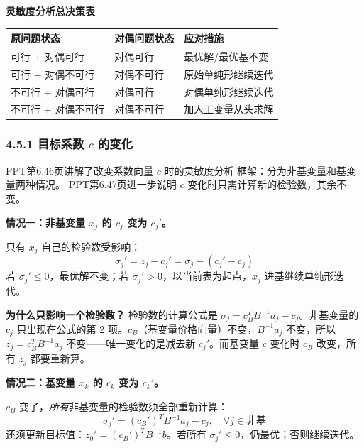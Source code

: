 \begin{defbox}
\textbf{灵敏度分析总决策表}
\medskip
{\footnotesize
\setlength{\tabcolsep}{1pt}
\begin{tabular}{@{}p{39mm}p{22mm}p{43mm}@{}}
\toprule
原问题状态 & 对偶问题状态 & 应对措施 \\
\midrule
可行 + 对偶可行 & 对偶可行 & 最优解/最优基不变 \\
可行 + 对偶不可行 & 对偶不可行 & 原始单纯形继续迭代 \\
不可行 + 对偶可行 & 对偶可行 & 对偶单纯形继续迭代 \\
不可行 + 对偶不可行 & 对偶不可行 & 加人工变量从头求解 \\
\bottomrule
\end{tabular}
}
\end{defbox}

\subsubsection{4.5.1 目标系数 $c$ 的变化}

PPT第6.46页讲解了改变系数向量 $c$ 时的灵敏度分析
框架：分为非基变量和基变量两种情况。
PPT第6.47页进一步说明 $c$ 变化时只需计算新的检验数，其余不变。
\smallskip
{}
\medskip

\textbf{情况一：非基变量 $x_j$ 的 $c_j$ 变为 $c_j'$。}

只有 $x_j$ 自己的检验数受影响：
\[
\sigma_j' = z_j - c_j' = \sigma_j - (c_j' - c_j)
\]
若 $\sigma_j' \le 0$，最优解不变；若 $\sigma_j' > 0$，以当前表为起点，$x_j$ 进基继续单纯形迭代。

\begin{notebox}
\textbf{为什么只影响一个检验数？} 检验数的计算公式是 $\sigma_j = c_B^T B^{-1} a_j - c_j$。非基变量的 $c_j$ 只出现在公式的第 2 项。$c_B$（基变量价格向量）不变，$B^{-1}a_j$ 不变，所以 $z_j = c_B^T B^{-1}a_j$ 不变——唯一变化的是减去新 $c_j'$。而基变量 $c$ 变化时 $c_B$ 改变，所有 $z_j$ 都要重新算。
\end{notebox}

\textbf{情况二：基变量 $x_k$ 的 $c_k$ 变为 $c_k'$。}

$c_B$ 变了，\emph{所有}非基变量的检验数须全部重新计算：
\[
\sigma_j' = (c_B')^T B^{-1} a_j - c_j, \quad \forall j \in \text{非基}
\]
还须更新目标值：$z_0' = (c_B')^T B^{-1} b$。若所有 $\sigma_j' \le 0$，仍最优；否则继续迭代。

%

